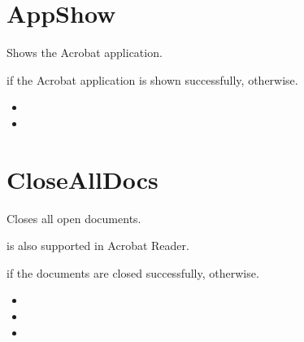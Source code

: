 \documentclass[letterpaper,12pt,english,openany,oneside]{sphinxmanual}
\begin{document}
\section{AppShow}
\label{\detokenize{IAC_API_DDE_Messages:id16}}
Shows the Acrobat application.


\begin{sphinxVerbatim}[commandchars=\\\{\}]
\PYG{p}{[}\PYG{p}{]}
\end{sphinxVerbatim}


 if the Acrobat application is shown successfully,  otherwise.

\label{\detokenize{IAC_API_DDE_Messages:related-methods-2}}
\begin{itemize}
\item {} 

\item {} 

\end{itemize}




\section{CloseAllDocs}
\label{\detokenize{IAC_API_DDE_Messages:id17}}
Closes all open documents.

 is also supported in Acrobat Reader.


\begin{sphinxVerbatim}[commandchars=\\\{\}]
\PYG{p}{[}\PYG{p}{]}
\end{sphinxVerbatim}


 if the documents are closed successfully,  otherwise.

\label{\detokenize{IAC_API_DDE_Messages:related-methods-3}}
\begin{itemize}
\item {} 

\item {} 

\item {} 

\end{itemize}
\end{document}

